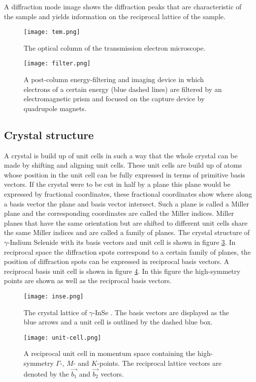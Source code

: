 A diffraction mode image shows the diffraction peaks that are characteristic of the sample and yields information on the reciprocal lattice of the sample.\cite{Egerton_2008}
%
\begin{figure}[H]
	\vspace{2cm}
	\centering
	\captionsetup{width=0.9\linewidth}
	\texttt{[image: tem.png]}
	\caption{The optical column of the transmission electron microscope.}
	\label{fig:tem}
\end{figure}
%
\begin{figure}[H]
	\centering
	\captionsetup{width=0.9\linewidth}
	\texttt{[image: filter.png]}
	\caption{A post-column energy-filtering and imaging device in which electrons of a certain energy (blue dashed lines) are filtered by an electromagnetic prism and focused on the capture device by quadrupole magnets.}
	\label{fig:filter}
\end{figure}
\vfill
\subsection{Crystal structure}
A crystal is build up of unit cells in such a way that the whole crystal can be made by shifting and aligning unit cells. These unit cells are build up of atoms whose position in the unit cell can be fully expressed in terms of primitive basis vectors. If the crystal were to be cut in half by a plane this plane would be expressed by fractional coordinates, these fractional coordinates show where along a basis vector the plane and basis vector intersect. Such a plane is called a Miller plane and the corresponding coordinates are called the Miller indices. Miller planes that have the same orientation but are shifted to different unit cells share the same Miller indices and are called a family of planes. The crystal structure of $\gamma$-Indium Selenide with its basis vectors and unit cell is shown in figure \ref{fig:inse}. In reciprocal space the diffraction spots correspond to a certain family of planes, the position of diffraction spots can be expressed in reciprocal basis vectors. A reciprocal basis unit cell is shown in figure \ref{fig:unit-cell}. In this figure the high-symmetry points are shown as well as the reciprocal basis vectors.\cite{Simon:1581455}\\
%
\begin{figure}[H]
	\centering
	\captionsetup{width=0.9\linewidth}
	\texttt{[image: inse.png]}
	\caption{The crystal lattice of $\gamma$-InSe \cite{Magorrian2019, MA2017244}. The basis vectors are displayed as the blue arrows and a unit cell is outlined by the dashed blue box.}
	\label{fig:inse}
\end{figure}
%
\begin{figure}[H]
	\centering
	\captionsetup{width=0.9\linewidth}
	\texttt{[image: unit-cell.png]}
	\caption{A reciprocal unit cell in momentum space containing the high-symmetry $\Gamma$-, $M$- and $K$-points. The reciprocal lattice vectors are denoted by the $\vec{b_1}$ and $\vec{b_2}$ vectors.}
	\label{fig:unit-cell}
\end{figure}
%
